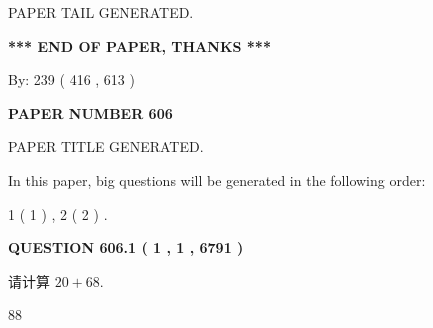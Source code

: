 \documentclass{ctexart}
\begin{document}
   
   
   
   
   
 \vspace{0.2in}
 
   
   
\vspace{2.0in} PAPER TAIL GENERATED.
   
   
   
   
\vspace{1.0in} 
{\textbf{\large{ *** END OF PAPER, THANKS *** }}} 
   
   
\hspace{1.0in} By: 
 239 ( 416 ,  613 )
   
   
   
   
\newpage 
\setcounter{page}{ 
   606001 } 
   
   
   
   
 {\textbf{ \Large{ PAPER NUMBER  606  }}}
   
   
\vspace{0.2in}
   
   
   
   
   
   
   
   
 \vspace{0.2in}
 
 
 
 
   
   
 PAPER TITLE GENERATED.
   
   
   
\vspace{0.2in}
   
In this paper, big questions will be generated in the following order: 
   
   
   1 ( 1 )
 ,
   2 ( 2 )
 .
  
\vspace{0.2in}
  
{\textbf{\Large{QUESTION
606.1 
 ( 1 , 1 , 6791 )
}}}
  
  
 
请计算 $ %
20 +  %
68 $.
 
 
 
\noindent{}
 
 

88
 
 
\noindent{}
 
\end{document}
